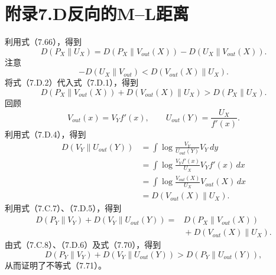 \section*{附录7.D\quad 反向的M–L距离}

利用式（7.66），得到
\begin{equation}
D(P_X\parallel U_X)=D(P_X\parallel V_{out}(X))
 -D(U_X\parallel V_{out}(X)).\tag{7.D.1}
\end{equation}
注意
\begin{equation}
-D(U_X\parallel V_{out})<D(V_{out}(X)\parallel U_X).\tag{7.D.2}
\end{equation}
将式（7.D.2）代入式（7.D.1），得到
\begin{equation}
D(P_X\parallel V_{out}(X))+D(V_{out}(X)\parallel U_X)
 >D(P_X\parallel U_X).\tag{7.D.3}
\end{equation}
回顾
\begin{equation}
V_{out}(x)=V_Yf'(x),\qquad U_{out}(Y)=\frac{U_X}{f'(x)}.\tag{7.D.4}
\end{equation}
利用式（7.D.4），得到
\begin{equation}
\begin{aligned}
D(V_Y\parallel U_{out}(Y))
 &=\int\log\frac{V_Y}{U_{out}(Y)}V_Y\,dy\\
 &=\int\log\frac{V_Yf'(x)}{U_X}V_Yf'(x)\,dx\\
 &=\int\log\frac{V_{out}(X)}{U_X}V_{out}(X)\,dx\\
 &=D(V_{out}(X)\parallel U_X).
\end{aligned}\tag{7.D.5}
\end{equation}
利用式（7.C.7）、（7.D.5），得到
\begin{equation}
\begin{aligned}
D(P_Y\parallel V_Y)+D(V_Y\parallel U_{out}(Y))
 ={}&D(P_X\parallel V_{out}(X))\\
&{}+D(V_{out}(X)\parallel U_X).
\end{aligned}\tag{7.D.6}
\end{equation}
由式（7.C.8）、（7.D.6）及式（7.70），得到
\begin{equation}
D(P_Y\parallel V_Y)+D(V_Y\parallel U_{out}(Y))
 >D(P_Y\parallel U_{out}(Y)),\tag{7.D.7}
\end{equation}
从而证明了不等式（7.71）。

